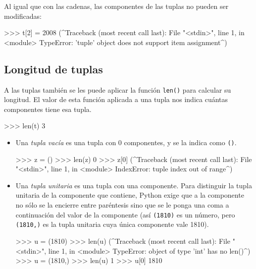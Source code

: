 Al igual que con las cadenas, las componentes de las tuplas no pueden ser
modificadas:

\begin{codigo-python-sn}
>>> t[2] = 2008
(^Traceback (most recent call last):
  File "<stdin>", line 1, in <module>
TypeError: 'tuple' object does not support item assignment^)
\end{codigo-python-sn}

\subsection{Longitud de tuplas}

A las tuplas también se les puede aplicar la función \lstinline+len()+
para calcular su longitud. El valor de esta función aplicada a
una tupla nos indica cuántas componentes tiene esa tupla.

\begin{codigo-python-sn}
>>> len(t)
3
\end{codigo-python-sn}


\begin{itemize}
\item Una \emph{tupla vacía} es una tupla con $0$ componentes, y se la
indica como \lstinline+()+.

\begin{codigo-python-sn}
>>> z = ()
>>> len(z)
0
>>> z[0]
(^Traceback (most recent call last):
  File "<stdin>", line 1, in <module>
IndexError: tuple index out of range^)
\end{codigo-python-sn}

\item Una \emph{tupla unitaria} es una tupla con una componente. Para
distinguir la tupla unitaria de la componente que contiene, Python exige
que a la componente no sólo se la encierre entre paréntesis sino que se le
ponga una coma a continuación del valor de la componente (así
\lstinline+(1810)+ es un número, pero \lstinline+(1810,)+ es la tupla
unitaria cuya única componente vale 1810).

\begin{codigo-python-sn}
>>> u = (1810)
>>> len(u)
(^Traceback (most recent call last):
  File "<stdin>", line 1, in <module>
TypeError: object of type 'int' has no len()^)
>>> u = (1810,)
>>> len(u)
1
>>> u[0]
1810
\end{codigo-python-sn}
\end{itemize}


